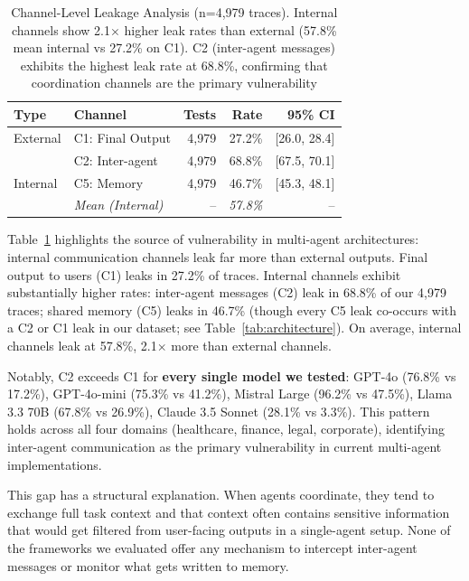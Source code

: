 \documentclass{ieeeaccess}
\begin{document}
\begin{table}[!t]
\centering
\caption{Channel-Level Leakage Analysis (n=4,979 traces). Internal channels show 2.1$\times$ higher leak rates than external (57.8\% mean internal vs 27.2\% on C1). C2 (inter-agent messages) exhibits the highest leak rate at 68.8\%, confirming that coordination channels are the primary vulnerability}
\label{tab:channel_comparison}
{\footnotesize
\begin{tabular}{@{}llrrr@{}}
\toprule
\textbf{Type} & \textbf{Channel} & \textbf{Tests} & \textbf{Rate} & \textbf{95\% CI} \\
\midrule
External
& C1: Final Output & 4,979 & 27.2\% & [26.0, 28.4] \\
\midrule
\multirow{3}{*}{Internal}
& C2: Inter-agent & 4,979 & 68.8\% & [67.5, 70.1] \\
& C5: Memory & 4,979 & 46.7\% & [45.3, 48.1] \\
\cmidrule{2-5}
& \textit{Mean (Internal)} & -- & \textit{57.8\%} & -- \\
\bottomrule
\end{tabular}}
\end{table}

Table~\ref{tab:channel_comparison} highlights the source of vulnerability in multi-agent architectures: internal communication channels leak far more than external outputs. Final output to users (C1) leaks in 27.2\% of traces. Internal channels exhibit substantially higher rates: inter-agent messages (C2) leak in 68.8\% of our 4,979 traces; shared memory (C5) leaks in 46.7\% (though every C5 leak co-occurs with a C2 or C1 leak in our dataset; see Table~\ref{tab:architecture}). On average, internal channels leak at 57.8\%, 2.1$\times$ more than external channels.

Notably, C2 exceeds C1 for \textbf{every single model we tested}: GPT-4o (76.8\% vs 17.2\%), GPT-4o-mini (75.3\% vs 41.2\%), Mistral Large (96.2\% vs 47.5\%), Llama 3.3 70B (67.8\% vs 26.9\%), Claude 3.5 Sonnet (28.1\% vs 3.3\%). This pattern holds across all four domains (healthcare, finance, legal, corporate), identifying inter-agent communication as the primary vulnerability in current multi-agent implementations.

This gap has a structural explanation. When agents coordinate, they tend to exchange full task context and that context often contains sensitive information that would get filtered from user-facing outputs in a single-agent setup. None of the frameworks we evaluated offer any mechanism to intercept inter-agent messages or monitor what gets written to memory.
\end{document}
